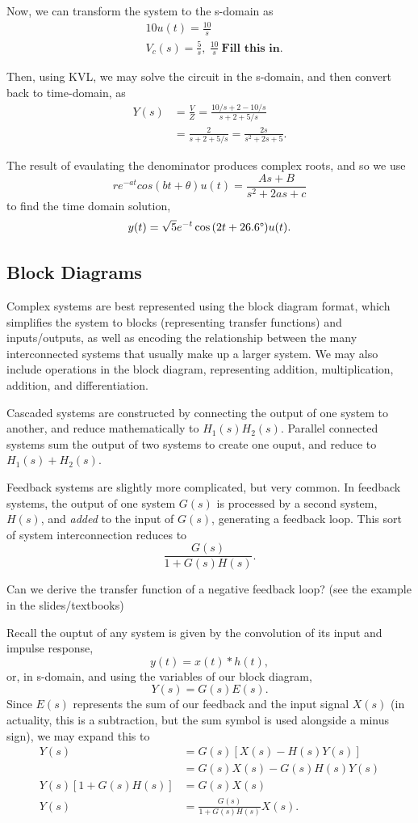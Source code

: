 \documentclass{article}
\begin{document}
Now, we can transform the system to the s-domain as
\begin{align*}
	&10u(t) = \frac{10}{s} \\
	&V_c(s) = \frac{5}{s}, \ \frac{10}{s} \ \mathrm{\textbf{Fill this in}}.
\end{align*}

Then, using KVL, we may solve the circuit in the s-domain, and then convert back to time-domain, as
\begin{align*}
	Y(s) &= \frac{V}{Z} = \frac{10/s + 2 - 10/s}{s + 2 + 5/s} \\
			 &=\frac{2}{s+2+5/s} = \frac{2s}{s^2+2s+5}.
\end{align*}

The result of evaulating the denominator produces complex roots, and so we use 
\[
	re^{-at}cos(bt+\theta)u(t) = \frac{As+B}{s^2+2as +c}
\]
to find the time domain solution,
\[
	y(t) = \sqrt{5}e^{-t}\cos{(2t+26.6\degree)}u(t).
\]

\subsection{Block Diagrams}

Complex systems are best represented using the block diagram format, which simplifies the system to blocks (representing transfer functions) and inputs/outputs, as well as encoding the relationship between the many interconnected systems that usually make up a larger system. We may also include operations in the block diagram, representing addition, multiplication, addition, and differentiation.

Cascaded systems are constructed by connecting the output of one system to another, and reduce mathematically to \(H_1(s)H_2(s)\). Parallel connected systems sum the output of two systems to create one ouput, and reduce to \(H_1(s) + H_2(s)\).

Feedback systems are slightly more complicated, but very common. In feedback systems, the output of one system \(G(s)\) is processed by a second system, \(H(s)\), and \textit{added} to the input of \(G(s)\), generating a feedback loop. This sort of system interconnection reduces to 
\[
  \frac{G(s)}{1+G(s)H(s)}.
\]

Can we derive the transfer function of a negative feedback loop? (see the example in the slides/textbooks)

Recall the ouptut of any system is given by the convolution of its input and impulse response, 
\[
  y(t) = x(t) * h(t),
\]
or, in s-domain, and using the variables of our block diagram,
\[
  Y(s) = G(s)E(s).
\]
Since \(E(s)\) represents the sum of our feedback and the input signal \(X(s)\) (in actuality, this is a subtraction, but the sum symbol is used alongside a minus sign), we may expand this to
\begin{align*}
	Y(s) &= G(s)[X(s)-H(s)Y(s)] \\
			 &=G(s)X(s) - G(s)H(s)Y(s) \\
	Y(s)[1+G(s)H(s)] &= G(s)X(s) \\
	Y(s) &= \frac{G(s)}{1+G(s)H(s)}X(s).
\end{align*}
\end{document}

